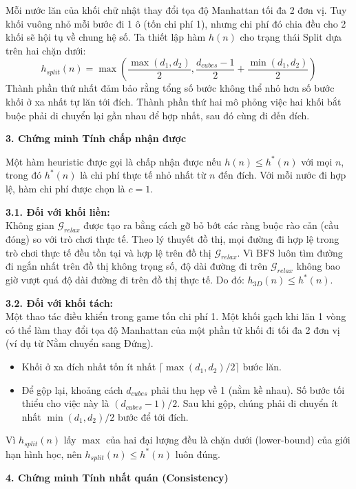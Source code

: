 \documentclass[12pt,a4paper]{article}
\begin{document}
Mỗi nước lăn của khối chữ nhật thay đổi tọa độ Manhattan tối đa 2 đơn vị. Tuy khối vuông nhỏ mỗi bước đi 1 ô (tốn chi phí 1), nhưng chi phí đó chia đều cho 2 khối sẽ hội tụ về chung hệ số. Ta thiết lập hàm $h(n)$ cho trạng thái Split dựa trên hai chặn dưới:
\begin{equation}
    h_{split}(n) = \max \left( \frac{\max(d_1, d_2)}{2}, \frac{d_{cubes} - 1}{2} + \frac{\min(d_1, d_2)}{2} \right)
\end{equation}
Thành phần thứ nhất đảm bảo rằng tổng số bước không thể nhỏ hơn số bước khối ở xa nhất tự lăn tới đích. Thành phần thứ hai mô phỏng việc hai khối bắt buộc phải di chuyển lại gần nhau để hợp nhất, sau đó cùng đi đến đích.

\textbf{3. Chứng minh Tính chấp nhận được}

Một hàm heuristic được gọi là chấp nhận được nếu $h(n) \le h^*(n)$ với mọi $n$, trong đó $h^*(n)$ là chi phí thực tế nhỏ nhất từ $n$ đến đích. Với mỗi nước đi hợp lệ, hàm chi phí được chọn là $c = 1$.

\textbf{3.1. Đối với khối liền:}\\
Không gian $\mathcal{G}_{relax}$ được tạo ra bằng cách gỡ bỏ bớt các ràng buộc rào cản (cầu đóng) so với trò chơi thực tế. Theo lý thuyết đồ thị, mọi đường đi hợp lệ trong trò chơi thực tế đều tồn tại và hợp lệ trên đồ thị $\mathcal{G}_{relax}$. Vì BFS luôn tìm đường đi ngắn nhất trên đồ thị không trọng số, độ dài đường đi trên $\mathcal{G}_{relax}$ không bao giờ vượt quá độ dài đường đi trên đồ thị thực tế. Do đó: $h_{3D}(n) \le h^*(n)$.

\textbf{3.2. Đối với khối tách:}\\
Một thao tác điều khiển trong game tốn chi phí 1. Một khối gạch khi lăn 1 vòng có thể làm thay đổi tọa độ Manhattan của một phần tử khối đi tối đa 2 đơn vị (ví dụ từ Nằm chuyển sang Đứng).
\begin{itemize}
    \item Khối ở xa đích nhất tốn ít nhất $\lceil \max(d_1, d_2) / 2 \rceil$ bước lăn.
    \item Để gộp lại, khoảng cách $d_{cubes}$ phải thu hẹp về 1 (nằm kề nhau). Số bước tối thiểu cho việc này là $(d_{cubes} - 1) / 2$. Sau khi gộp, chúng phải di chuyển ít nhất $\min(d_1, d_2) / 2$ bước để tới đích.
\end{itemize}
Vì $h_{split}(n)$ lấy $\max$ của hai đại lượng đều là chặn dưới (lower-bound) của giới hạn hình học, nên $h_{split}(n) \le h^*(n)$ luôn đúng.

\textbf{4. Chứng minh Tính nhất quán (Consistency)}
\end{document}
